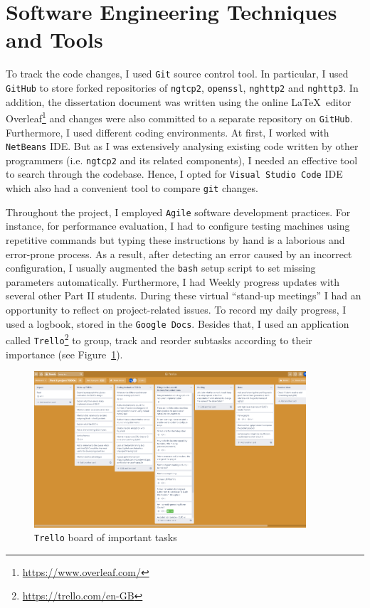 \documentclass[12pt,a4paper,twoside,openright]{report}
\begin{document}
\section{Software Engineering Techniques and Tools} \label{Software_Engineering_Techniques_and_Tools}
    To track the code changes, I used \texttt{Git} source control tool.
    In particular, I used \texttt{GitHub} to store forked repositories of \texttt{ngtcp2}, \texttt{openssl}, \texttt{nghttp2} and \texttt{nghttp3}.
    In addition, the dissertation document was written using the online \LaTeX\  editor Overleaf\footnote{\url{https://www.overleaf.com/}} and changes were also committed to a separate repository on \texttt{GitHub}.
    Furthermore, I used different coding environments.
    At first, I worked with \texttt{NetBeans} IDE.
    But as I was extensively analysing existing code written by other programmers (i.e. \texttt{ngtcp2} and its related components), I needed an effective tool to search through the codebase.
    Hence, I opted for \texttt{Visual Studio Code} IDE which also had a convenient tool to compare \texttt{git} changes.
    
    
    Throughout the project, I employed \texttt{Agile} software development practices.
    For instance, for performance evaluation, I had to configure testing machines using repetitive commands but typing these instructions by hand is a laborious and error-prone process.
    As a result, after detecting an error caused by an incorrect configuration, I usually augmented the \texttt{bash} setup script to set missing parameters automatically.
    Furthermore, I had Weekly progress updates with several other Part II students.
    During these virtual \enquote{stand-up meetings} I had an opportunity to reflect on project-related issues.
    To record my daily progress, I used a logbook, stored in the \texttt{Google Docs}.
    Besides that, I used an application called \texttt{Trello}\footnote{\url{https://trello.com/en-GB}} to group, track and reorder subtasks according to their importance (see Figure~\ref{fig:Trello_board}).

    \begin{figure}[ht]
    \centering
    \includegraphics[width=0.9\textwidth]{figs/Trello_board.PNG}
    \caption{\texttt{Trello} board of important tasks}
    \label{fig:Trello_board}
    \end{figure}
    
\end{document}
